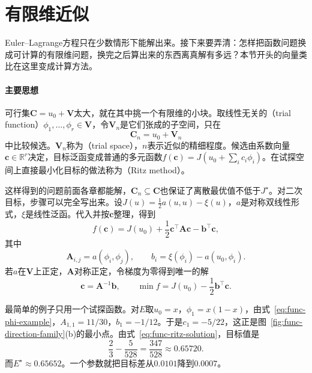\section{有限维近似}
\label{sec:func-finite}

Euler--Lagrange方程只在少数情形下能解出来。接下来要弄清：怎样把函数问题换成可计算的有限维问题，换完之后算出来的东西离真解有多远？本节开头的向量类比在这里变成计算方法。

\paragraph{主要思想}
可行集$\bm{C}=u_0+\bm{V}$太大，就在其中挑一个有限维的小块。取线性无关的（trial function）$\phi_1,\ldots,\phi_r\in\bm{V}$，令$\bm{V}_n$是它们张成的子空间，只在
\begin{equation}
 \bm{C}_n=u_0+\bm{V}_n
 \label{eq:func-trial}
\end{equation}
中比较候选。$\bm{V}_n$称为（trial space），$n$表示近似的精细程度。候选由系数向量$\bm{c}\in\mathbb{R}^r$决定，目标泛函变成普通的多元函数$f(\bm{c})=J(u_0+\sum_ic_i\phi_i)$。在试探空间上直接最小化目标的做法称为（Ritz method）。

这样得到的问题前面各章都能解，$\bm{C}_n\subseteq\bm{C}$也保证了离散最优值不低于$J^\star$。对二次目标，步骤可以完全写出来。设$J(u)=\frac12a(u,u)-\xi(u)$，$a$是对称双线性形式，$\xi$是线性泛函。代入并按$\bm{c}$整理，得到
\begin{equation}
 f(\bm{c})=J(u_0)+\frac12\bm{c}^\top\bm{A}\bm{c}-\bm{b}^\top\bm{c},
 \label{eq:func-ritz-quadratic}
\end{equation}
其中
\begin{equation}
 \bm{A}_{i,j}=a(\phi_i,\phi_j),\qquad b_i=\xi(\phi_i)-a(u_0,\phi_i).
 \label{eq:func-ritz-matrix}
\end{equation}
若$a$在$\bm{V}$上正定，$\bm{A}$对称正定，令梯度为零得到唯一的解
\begin{equation}
 \bm{c}=\bm{A}^{-1}\bm{b},\qquad \min f=J(u_0)-\frac12\bm{b}^\top\bm{c}.
 \label{eq:func-ritz-solution}
\end{equation}

最简单的例子只用一个试探函数。对$E$取$u_0=x$，$\phi_1=x(1-x)$，由式~\eqref{eq:func-phi-example}，$A_{1,1}=11/30$，$b_1=-1/12$。于是$c_1=-5/22$，这正是图~\ref{fig:func-direction-family}(b)的最小点。由式~\eqref{eq:func-ritz-solution}，目标值是
\[
 \frac23-\frac{5}{528}=\frac{347}{528}\approx0.65720.
\]
而$E^\star\approx0.65652$。一个参数就把目标差从$0.0101$降到$0.0007$。

